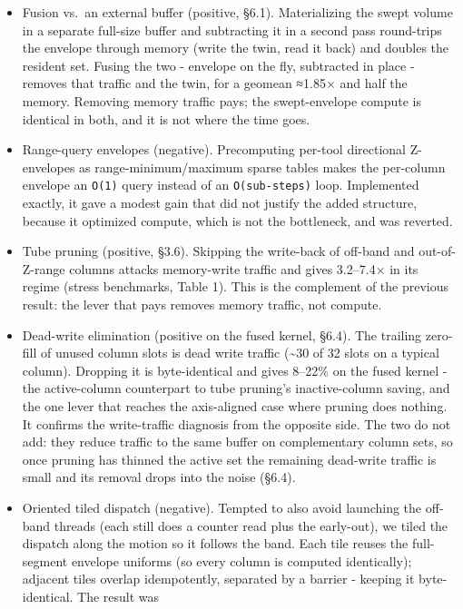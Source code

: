 \documentclass[
]{article}
\providecommand{\tightlist}{%
  \setlength{\itemsep}{0pt}\setlength{\parskip}{0pt}}
\begin{document}
\begin{itemize}
\tightlist
\item
  Fusion vs.~an external buffer (positive, §6.1). Materializing the
  swept volume in a separate full-size buffer and subtracting it in a
  second pass round-trips the envelope through memory (write the twin,
  read it back) and doubles the resident set. Fusing the two - envelope
  on the fly, subtracted in place - removes that traffic and the twin,
  for a geomean ≈1.85× and half the memory. Removing memory traffic
  pays; the swept-envelope compute is identical in both, and it is not
  where the time goes.
\item
  Range-query envelopes (negative). Precomputing per-tool directional
  Z-envelopes as range-minimum/maximum sparse tables makes the
  per-column envelope an \texttt{O(1)} query instead of an
  \texttt{O(sub-steps)} loop. Implemented exactly, it gave a modest gain
  that did not justify the added structure, because it optimized
  compute, which is not the bottleneck, and was reverted.
\item
  Tube pruning (positive, §3.6). Skipping the write-back of off-band and
  out-of-Z-range columns attacks memory-write traffic and gives
  3.2--7.4× in its regime (stress benchmarks, Table 1). This is the
  complement of the previous result: the lever that pays removes memory
  traffic, not compute.
\item
  Dead-write elimination (positive on the fused kernel, §6.4). The
  trailing zero-fill of unused column slots is dead write traffic
  (\textasciitilde30 of 32 slots on a typical column). Dropping it is
  byte-identical and gives 8--22\% on the fused kernel - the
  active-column counterpart to tube pruning's inactive-column saving,
  and the one lever that reaches the axis-aligned case where pruning
  does nothing. It confirms the write-traffic diagnosis from the
  opposite side. The two do not add: they reduce traffic to the same
  buffer on complementary column sets, so once pruning has thinned the
  active set the remaining dead-write traffic is small and its removal
  drops into the noise (§6.4).
\item
  Oriented tiled dispatch (negative). Tempted to also avoid launching
  the off-band threads (each still does a counter read plus the
  early-out), we tiled the dispatch along the motion so it follows the
  band. Each tile reuses the full-segment envelope uniforms (so every
  column is computed identically); adjacent tiles overlap idempotently,
  separated by a barrier - keeping it byte-identical. The result was

\end{itemize}
\end{document}
